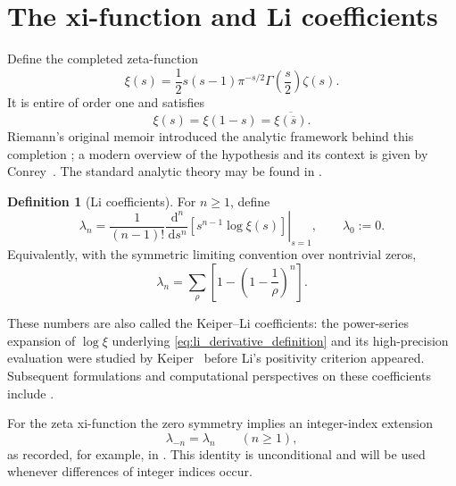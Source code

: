 \documentclass[preprint,12pt]{elsarticle}
\numberwithin{equation}{section}
\theoremstyle{plain}
\theoremstyle{definition}
\newtheorem{definition}[theorem]{Definition}
\theoremstyle{remark}
\newcommand{\dd}{\,\mathrm d}
\begin{document}
\section{The xi-function and Li coefficients}
\label{sec:li_background}

Define the completed zeta-function
\begin{equation}
\xi(s)=\frac12 s(s-1)\pi^{-s/2}\Gamma\!\left(\frac{s}{2}\right)\zeta(s).
\label{eq:xi_definition}
\end{equation}
It is entire of order one and satisfies
\begin{equation}
\xi(s)=\xi(1-s)=\overline{\xi(\overline{s})}.
\label{eq:xi_symmetry}
\end{equation}
Riemann's original memoir introduced the analytic framework behind this completion
\cite{Riemann1859}; a modern overview of the hypothesis and its context is given by
Conrey~\cite{Conrey2003}.  The standard analytic theory may be found in
\cite{Edwards1974,Titchmarsh1986,Bombieri2010}.

\begin{definition}[Li coefficients]
\label{def:li_coefficients}
For $n\ge1$, define
\begin{equation}
\lambda_n=
\frac{1}{(n-1)!}
\left.
\frac{\dd^n}{\dd s^n}
\left[s^{n-1}\log\xi(s)\right]
\right|_{s=1},
\qquad \lambda_0:=0.
\label{eq:li_derivative_definition}
\end{equation}
Equivalently, with the symmetric limiting convention over nontrivial zeros,
\begin{equation}
\lambda_n=
\sum_{\rho}
\left[1-\left(1-\frac1\rho\right)^n\right].
\label{eq:li_zero_definition}
\end{equation}
\end{definition}

These numbers are also called the Keiper--Li coefficients: the power-series expansion of $\log\xi$
underlying \eqref{eq:li_derivative_definition} and its high-precision evaluation were studied by
Keiper~\cite{Keiper1992} before Li's positivity criterion appeared.  Subsequent formulations and
computational perspectives on these coefficients include
\cite{Coffey2007ThetaLaguerre,Coffey2010Polygamma,Coffey2010ZeroSums,
Matiyasevich2007a,Matiyasevich2007b}.

For the zeta xi-function the zero symmetry implies an integer-index extension
\begin{equation}
\lambda_{-n}=\lambda_n
\qquad(n\ge1),
\label{eq:li_negative_symmetry}
\end{equation}
as recorded, for example, in \cite[Eq.~(1.2)]{Lagarias2007}. This identity is unconditional and will be used whenever differences of integer indices occur.
\end{document}
